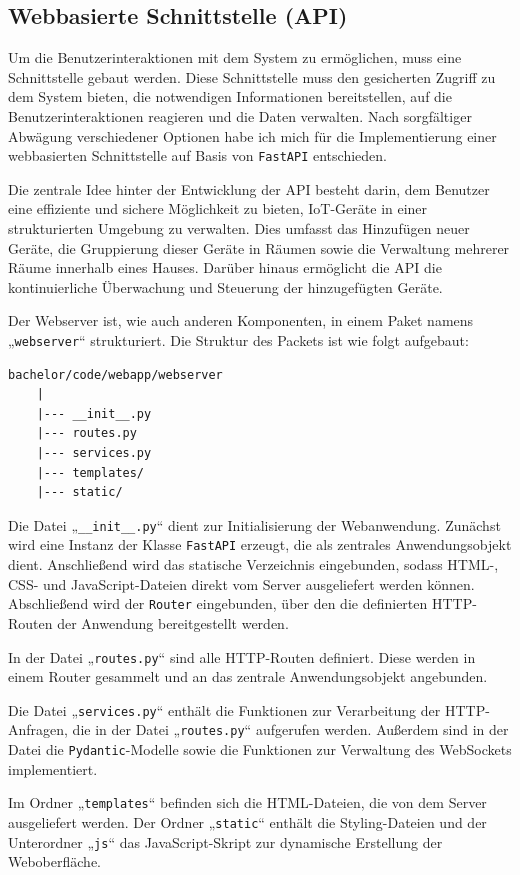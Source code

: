 \documentclass[12pt, letterpaper]{article}
\begin{document}
  \subsection{Webbasierte Schnittstelle (API)} 
  \par Um die Benutzerinteraktionen mit dem System zu ermöglichen, muss eine Schnittstelle gebaut werden. Diese Schnittstelle muss den gesicherten Zugriff zu dem System bieten, die notwendigen Informationen bereitstellen, auf die Benutzerinteraktionen reagieren und die Daten verwalten. Nach sorgfältiger Abwägung verschiedener Optionen habe ich mich für die Implementierung einer webbasierten Schnittstelle auf Basis von \texttt{FastAPI} entschieden.
  \par Die zentrale Idee hinter der Entwicklung der API besteht darin, dem Benutzer eine effiziente und sichere Möglichkeit zu bieten, IoT-Geräte in einer strukturierten Umgebung zu verwalten. Dies umfasst das Hinzufügen neuer Geräte, die Gruppierung dieser Geräte in Räumen sowie die Verwaltung mehrerer Räume innerhalb eines Hauses. Darüber hinaus ermöglicht die API die kontinuierliche Überwachung und Steuerung der hinzugefügten Geräte.
  \par Der Webserver ist, wie auch anderen Komponenten, in einem Paket namens „\texttt{webserver}“ strukturiert. Die Struktur des Packets ist wie folgt aufgebaut:
  \begin{Verbatim}[frame=single]
    bachelor/code/webapp/webserver
    |
    |--- __init__.py
    |--- routes.py
    |--- services.py
    |--- templates/
    |--- static/
  \end{Verbatim} 
  \par Die Datei „\texttt{\_\_init\_\_.py}“ dient zur Initialisierung der Webanwendung. Zunächst wird eine Instanz der Klasse \texttt{FastAPI} erzeugt, die als zentrales Anwendungsobjekt dient. Anschließend wird das statische Verzeichnis eingebunden, sodass HTML-, CSS- und JavaScript-Dateien direkt vom Server ausgeliefert werden können. Abschließend wird der \texttt{Router} eingebunden, über den die definierten HTTP-Routen der Anwendung bereitgestellt werden.
  \par In der Datei „\texttt{routes.py}“ sind alle HTTP-Routen definiert. Diese werden in einem Router gesammelt und an das zentrale Anwendungsobjekt angebunden. 
  \par Die Datei „\texttt{services.py}“ enthält die Funktionen zur Verarbeitung der HTTP-Anfragen, die in der Datei „\texttt{routes.py}“ aufgerufen werden. Außerdem sind in der Datei die \texttt{Pydantic}-Modelle sowie die Funktionen zur Verwaltung des WebSockets implementiert. 
  \par Im Ordner „\texttt{templates}“ befinden sich die HTML-Dateien, die von dem Server ausgeliefert werden. Der Ordner „\texttt{static}“ enthält die Styling-Dateien und der Unterordner „\texttt{js}“ das JavaScript-Skript zur dynamische Erstellung der Weboberfläche.
\end{document}
